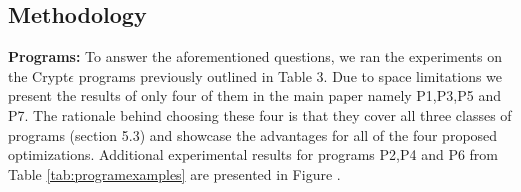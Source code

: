 \subsection{Methodology} 
\textbf{Programs:}
To answer the aforementioned questions, we ran the experiments on the Crypt$\epsilon$ programs previously outlined in Table 3. Due to space limitations we present the results of only four of them in the main paper namely P1,P3,P5 and P7. The rationale behind choosing these four is that they cover all three classes of programs (section 5.3) and showcase the advantages for all of the four proposed optimizations. %
Additional experimental results for programs P2,P4 and P6 from Table \ref{tab:programexamples} are presented in Figure .%

